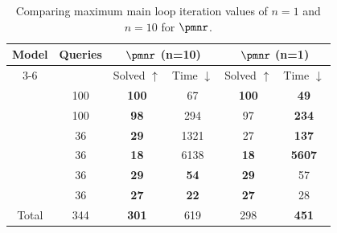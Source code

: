 \begin{table}[htb]
    \centering
	\caption{Comparing maximum main loop iteration values of \(n=1\) and \(n=10\) for \(\pmnr\).}
	\begin{tabular}{|c|c|cc|cc|}
		\hline
		\multirow{2}{*}{Model}                   & \multirow{2}{*}{Queries}       &
		\multicolumn{2}{c|}{\(\pmnr\) (n=10)} & \multicolumn{2}{c|}{\(\pmnr\) (n=1)}                                                                                                                                \\ \cline{3-6}
		                                         &                                & \multicolumn{1}{c|}{Solved \(\uparrow\)} & Time \(\downarrow\) & \multicolumn{1}{c|}{Solved \(\uparrow\)} & Time \(\downarrow\) \\ \hline
		\LeakyReluFive                           & 100                            & \multicolumn{1}{c|}{\textbf{100}}        & 67                  & \multicolumn{1}{c|}{\textbf{100}}        & \textbf{49}         \\ \hline
		\LeakyReluEight                          & 100                            & \multicolumn{1}{c|}{\textbf{98}}         & 294                 & \multicolumn{1}{c|}{97}                  & \textbf{234}        \\ \hline
		\LeakyReluFourteen                       & 36                             & \multicolumn{1}{c|}{\textbf{29}}         & 1321                & \multicolumn{1}{c|}{27}                  & \textbf{137}        \\ \hline
		\ReluSignMax                             & 36                             & \multicolumn{1}{c|}{\textbf{18}}         & 6138                & \multicolumn{1}{c|}{\textbf{18}}         & \textbf{5607}       \\ \hline
		\ReluBilinearSoftmax                     & 36                             & \multicolumn{1}{c|}{\textbf{29}}         & \textbf{54}         & \multicolumn{1}{c|}{\textbf{29}}         & 57                  \\ \hline
		\LeakyReluSigmoid                        & 36                             & \multicolumn{1}{c|}{\textbf{27}}         & \textbf{22}         & \multicolumn{1}{c|}{\textbf{27}}         & 28                  \\ \hline
		Total                                    & 344                            & \multicolumn{1}{c|}{\textbf{301}}        & 619                 & \multicolumn{1}{c|}{298}                 & \textbf{451}        \\ \hline
	\end{tabular}
	\label{tab:results-once}
\end{table}